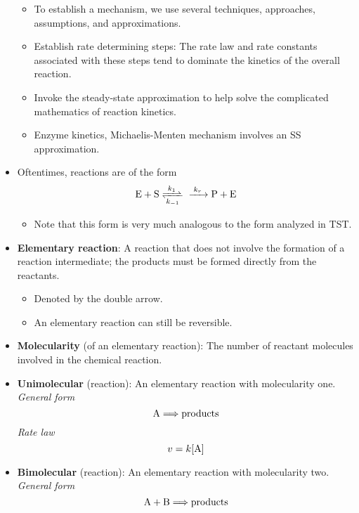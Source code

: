 \documentclass[../notes.tex]{subfiles}
\begin{document}
\begin{itemize}
\begin{itemize}
        \item To establish a mechanism, we use several techniques, approaches, assumptions, and approximations.
        \item Establish rate determining steps: The rate law and rate constants associated with these steps tend to dominate the kinetics of the overall reaction.
        \item Invoke the steady-state approximation to help solve the complicated mathematics of reaction kinetics.
        \item Enzyme kinetics, Michaelis-Menten mechanism involves an SS approximation.
    \end{itemize}
    \item Oftentimes, reactions are of the form
    \begin{align*}
        \ce{E + S <=>[$k_1$][$k_{-1}$] ->[$k_r$] P + E}
    \end{align*}
    \begin{itemize}
        \item Note that this form is very much analogous to the form analyzed in TST.
    \end{itemize}
    \item \textbf{Elementary reaction}: A reaction that does not involve the formation of a reaction intermediate; the products must be formed directly from the reactants.
    \begin{itemize}
        \item Denoted by the double arrow.
        \item An elementary reaction can still be reversible.
    \end{itemize}
    \item \textbf{Molecularity} (of an elementary reaction): The number of reactant molecules involved in the chemical reaction.
    \item \textbf{Unimolecular} (reaction): An elementary reaction with molecularity one. \emph{General form}
    \begin{equation*}
        \ce{A} \Longrightarrow \text{products}
    \end{equation*}
    \emph{Rate law}
    \begin{equation*}
        v = k[\ce{A}]
    \end{equation*}
    \item \textbf{Bimolecular} (reaction): An elementary reaction with molecularity two. \emph{General form}
    \begin{equation*}
        \ce{A}+\ce{B} \Longrightarrow \text{products}

\end{equation*}
\end{itemize}
\end{document}
